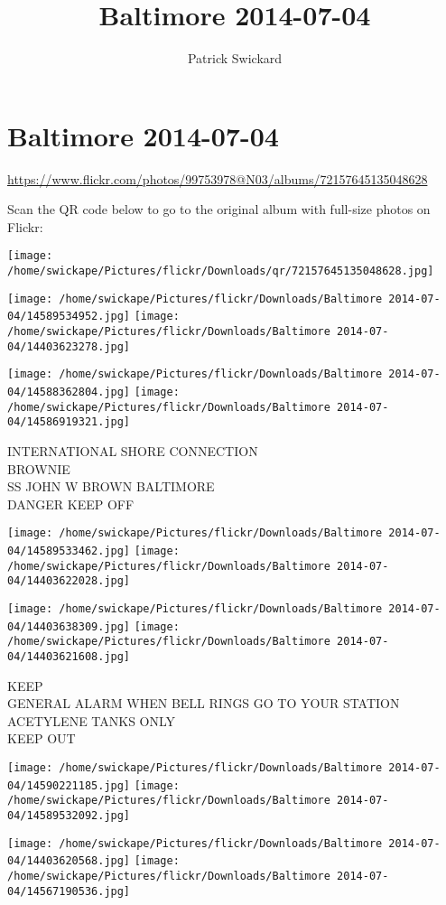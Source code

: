 \documentclass[10pt,letterpaper]{article}
\title{Baltimore 2014-07-04}
\author{Patrick Swickard}
\date{}
\begin{document}
\section*{Baltimore 2014-07-04}

\url{https://www.flickr.com/photos/99753978@N03/albums/72157645135048628}

Scan the QR code below to go to the original album with full-size photos on Flickr:

\texttt{[image: /home/swickape/Pictures/flickr/Downloads/qr/72157645135048628.jpg]}
\pagebreak

\texttt{[image: /home/swickape/Pictures/flickr/Downloads/Baltimore 2014-07-04/14589534952.jpg]}
\texttt{[image: /home/swickape/Pictures/flickr/Downloads/Baltimore 2014-07-04/14403623278.jpg]}

\texttt{[image: /home/swickape/Pictures/flickr/Downloads/Baltimore 2014-07-04/14588362804.jpg]}
\texttt{[image: /home/swickape/Pictures/flickr/Downloads/Baltimore 2014-07-04/14586919321.jpg]}

INTERNATIONAL SHORE CONNECTION\\
BROWNIE\\
SS JOHN W BROWN BALTIMORE\\
DANGER KEEP OFF
\pagebreak

\texttt{[image: /home/swickape/Pictures/flickr/Downloads/Baltimore 2014-07-04/14589533462.jpg]}
\texttt{[image: /home/swickape/Pictures/flickr/Downloads/Baltimore 2014-07-04/14403622028.jpg]}

\texttt{[image: /home/swickape/Pictures/flickr/Downloads/Baltimore 2014-07-04/14403638309.jpg]}
\texttt{[image: /home/swickape/Pictures/flickr/Downloads/Baltimore 2014-07-04/14403621608.jpg]}

KEEP\\
GENERAL ALARM WHEN BELL RINGS GO TO YOUR STATION\\
ACETYLENE TANKS ONLY\\
KEEP OUT
\pagebreak

\texttt{[image: /home/swickape/Pictures/flickr/Downloads/Baltimore 2014-07-04/14590221185.jpg]}
\texttt{[image: /home/swickape/Pictures/flickr/Downloads/Baltimore 2014-07-04/14589532092.jpg]}

\texttt{[image: /home/swickape/Pictures/flickr/Downloads/Baltimore 2014-07-04/14403620568.jpg]}
\texttt{[image: /home/swickape/Pictures/flickr/Downloads/Baltimore 2014-07-04/14567190536.jpg]}
\end{document}
